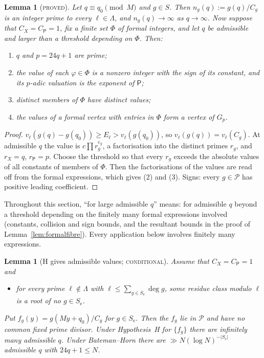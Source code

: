 \documentclass[11pt,reqno]{amsart}
\newtheorem{lemma}[theorem]{Lemma}
\theoremstyle{definition}
\newcommand{\Pp}{\mathsf P}
\newcommand{\cP}{\mathcal P}
\newcommand{\Se}{S_{\mathrm e}}
\newcommand{\status}[1]{\textsc{#1}}
\begin{document}
\begin{lemma}[\status{proved}]\label{lem:values}
Let $q\equiv q_0\pmod M$ and $g\in S$.  Then $n_g(q):=g(q)/C_g$ is an
integer prime to every $\ell\in\Lambda$, and $n_g(q)\to\infty$ as
$q\to\infty$.  Now suppose that $C_X=C_\Pp=1$, fix a finite set $\Phi$ of
formal integers, and let $q$ be admissible and larger than a threshold
depending on $\Phi$.  Then:
\begin{enumerate}
\item $q$ and $p=24q+1$ are prime;
\item the value of each $\varphi\in\Phi$ is a nonzero integer with the sign
of its constant, and its $p$-adic valuation is the exponent of $\Pp$;
\item distinct members of $\Phi$ have distinct values;
\item the values of a formal vertex with entries in $\Phi$ form a vertex of
$G_p$.
\end{enumerate}
\end{lemma}

\begin{proof}
$v_\ell(g(q)-g(q_0))\ge E_\ell>v_\ell(g(q_0))$, so
$v_\ell(g(q))=v_\ell(C_g)$.  At admissible $q$ the value is
$c\prod r_g^{e_g}$, a factorisation into the distinct primes $r_g$, and
$r_X=q$, $r_{\Pp}=p$.  Choose the threshold so that every $r_g$ exceeds the
absolute values of all constants of members of $\Phi$.  Then the
factorisations of the values are read off from the formal expressions,
which gives (2) and (3).  Signs: every $g\in\cP$ has positive leading
coefficient.
\end{proof}

Throughout this section, ``for large admissible $q$'' means: for admissible
$q$ beyond a threshold depending on the finitely many formal expressions
involved (constants, collision and sign bounds, and the resultant bounds in
the proof of Lemma~\ref{lem:formalfibre}).  Every application below
involves finitely many expressions.

\begin{lemma}[H gives admissible values; \status{conditional}]\label{lem:H}
Assume that $C_X=C_\Pp=1$ and
\begin{itemize}
\item[(E3)] for every prime $\ell\notin\Lambda$ with
$\ell\le\sum_{g\in\Se}\deg g$, some residue class modulo $\ell$ is a root
of no $g\in\Se$.
\end{itemize}
Put $f_g(y)=g(My+q_0)/C_g$ for $g\in\Se$.  Then the $f_g$ lie in $\cP$ and
have no common fixed prime divisor.  Under Hypothesis~H for $\{f_g\}$ there
are infinitely many admissible $q$.  Under Bateman--Horn there are
$\gg N(\log N)^{-|\Se|}$ admissible $q$ with $24q+1\le N$.
\end{lemma}
\end{document}
